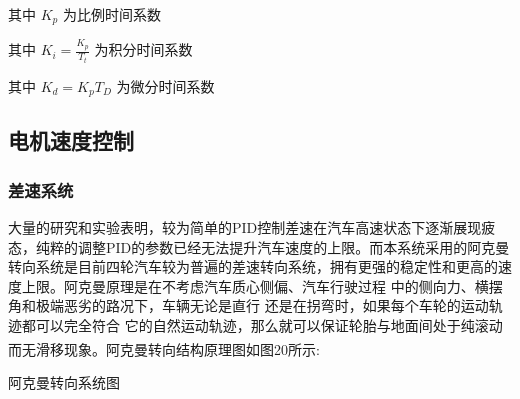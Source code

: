 \documentclass{article}%
\begin{document}
\begin{multicols}{2}
		其中  $K_{p}$  为比例时间系数
		
		其中  $K_{i}=\frac{K_{p}}{T_{t}}$ 为积分时间系数
		
		其中  $ K_{d}=K_{p} T_{D} $ 为微分时间系数
		
			
		\subsection{电机速度控制}
		\subsubsection{差速系统}
		大量的研究和实验表明，较为简单的PID控制差速在汽车高速状态下逐渐展现疲态，纯粹的调整PID的参数已经无法提升汽车速度的上限。而本系统采用的阿克曼转向系统是目前四轮汽车较为普遍的差速转向系统，拥有更强的稳定性和更高的速度上限。阿克曼原理是在不考虑汽车质心侧偏、汽车行驶过程 中的侧向力、横摆角和极端恶劣的路况下，车辆无论是直行 还是在拐弯时，如果每个车轮的运动轨迹都可以完全符合 它的自然运动轨迹，那么就可以保证轮胎与地面间处于纯滚动而无滑移现象\textsuperscript{\cite{ref8}}。阿克曼转向结构原理图如图20所示:
		
		\begin{center}
			\caption{阿克曼转向系统图}		
		\end{center}
		

\end{multicols}
\end{document}
